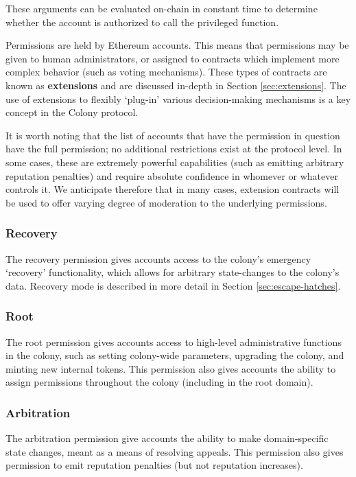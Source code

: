 These arguments can be evaluated on-chain in constant time to determine whether the account is authorized to call the privileged function.

Permissions are held by Ethereum accounts. This means that permissions may be given to human administrators, or assigned to contracts which implement more complex behavior (such as voting mechanisms). These types of contracts are known as \textbf{extensions} and are discussed in-depth in Section \ref{sec:extensions}. The use of extensions to flexibly `plug-in' various decision-making mechanisms is a key concept in the Colony protocol.

It is worth noting that the list of accounts that have the permission in question have the full permission; no additional restrictions exist at the protocol level. In some cases, these are extremely powerful capabilities (such as emitting arbitrary reputation penalties) and require absolute confidence in whomever or whatever controls it. We anticipate therefore that in many cases, extension contracts will be used to offer varying degree of moderation to the underlying permissions.

\subsubsection*{Recovery}

The recovery permission gives accounts access to the colony's emergency `recovery' functionality, which allows for arbitrary state-changes to the colony's data. Recovery mode is described in more detail in Section \ref{sec:escape-hatches}.

\subsubsection*{Root}

The root permission gives accounts access to high-level administrative functions in the colony, such as setting colony-wide parameters, upgrading the colony, and minting new internal tokens. This permission also gives accounts the ability to assign permissions throughout the colony (including in the root domain).

\subsubsection*{Arbitration}

The arbitration permission give accounts the ability to make domain-specific state changes, meant as a means of resolving appeals. This permission also gives permission to emit reputation penalties (but not reputation increases).

